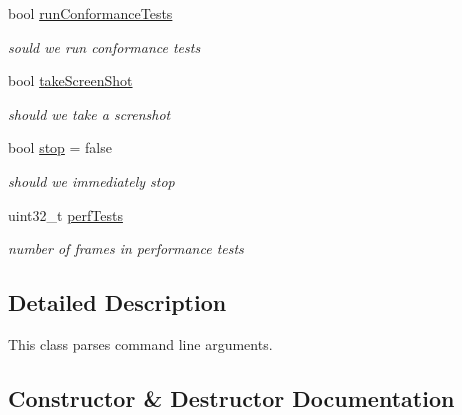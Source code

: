 \begin{DoxyCompactItemize}
\mbox{\label{classArguments_a6a3119fc79128d21da149e1d46884412}} 
bool \hyperlink{classArguments_a6a3119fc79128d21da149e1d46884412}{run\+Conformance\+Tests}
\begin{DoxyCompactList}\small\item\em sould we run conformance tests \end{DoxyCompactList}\item 
\mbox{\label{classArguments_a830a8ebb96c1a04c951b6c35f014cc8d}} 
bool \hyperlink{classArguments_a830a8ebb96c1a04c951b6c35f014cc8d}{take\+Screen\+Shot}
\begin{DoxyCompactList}\small\item\em should we take a screnshot \end{DoxyCompactList}\item 
\mbox{\label{classArguments_a2dd49c62c3372545d834d26ae3b66a2f}} 
bool \hyperlink{classArguments_a2dd49c62c3372545d834d26ae3b66a2f}{stop} = false
\begin{DoxyCompactList}\small\item\em should we immediately stop \end{DoxyCompactList}\item 
\mbox{\label{classArguments_a8c2fdc6e0dfb18c58314d7a736e5ca94}} 
uint32\+\_\+t \hyperlink{classArguments_a8c2fdc6e0dfb18c58314d7a736e5ca94}{perf\+Tests}
\begin{DoxyCompactList}\small\item\em number of frames in performance tests \end{DoxyCompactList}\end{DoxyCompactItemize}


\subsection{Detailed Description}
This class parses command line arguments. 

\subsection{Constructor \& Destructor Documentation}
\mbox{\label{classArguments_a3d9dd7b675eac3c375c6b2e9bb13e896}} 
